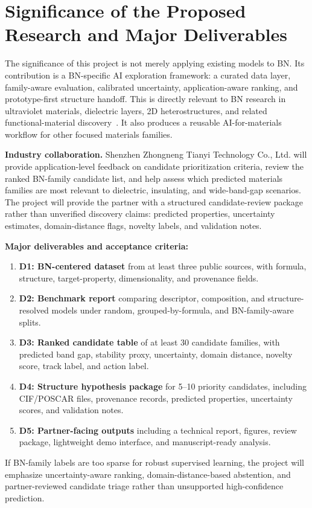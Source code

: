 \documentclass[10pt,a4paper]{article}
\begin{document}
\section{Significance of the Proposed Research and Major Deliverables}
The significance of this project is not merely applying existing models to BN. Its contribution is a BN-specific AI exploration framework: a curated data layer, family-aware evaluation, calibrated uncertainty, application-aware ranking, and prototype-first structure handoff. This is directly relevant to BN research in ultraviolet materials, dielectric layers, 2D heterostructures, and related functional-material discovery~\cite{watanabe2004_hbn_uv,cassabois2016_hbn_indirect,dean2010_hbn_graphene}. It also produces a reusable AI-for-materials workflow for other focused materials families.

\textbf{Industry collaboration.}
Shenzhen Zhongneng Tianyi Technology Co., Ltd. will provide application-level feedback on candidate prioritization criteria, review the ranked BN-family candidate list, and help assess which predicted materials families are most relevant to dielectric, insulating, and wide-band-gap scenarios. The project will provide the partner with a structured candidate-review package rather than unverified discovery claims: predicted properties, uncertainty estimates, domain-distance flags, novelty labels, and validation notes.

\textbf{Major deliverables and acceptance criteria:}
\begin{enumerate}[leftmargin=*]
  \item \textbf{D1: BN-centered dataset} from at least three public sources, with formula, structure, target-property, dimensionality, and provenance fields.
  \item \textbf{D2: Benchmark report} comparing descriptor, composition, and structure-resolved models under random, grouped-by-formula, and BN-family-aware splits.
  \item \textbf{D3: Ranked candidate table} of at least 30 candidate families, with predicted band gap, stability proxy, uncertainty, domain distance, novelty score, track label, and action label.
  \item \textbf{D4: Structure hypothesis package} for 5--10 priority candidates, including CIF/POSCAR files, provenance records, predicted properties, uncertainty scores, and validation notes.
  \item \textbf{D5: Partner-facing outputs} including a technical report, figures, review package, lightweight demo interface, and manuscript-ready analysis.
\end{enumerate}
If BN-family labels are too sparse for robust supervised learning, the project will emphasize uncertainty-aware ranking, domain-distance-based abstention, and partner-reviewed candidate triage rather than unsupported high-confidence prediction.
\end{document}
